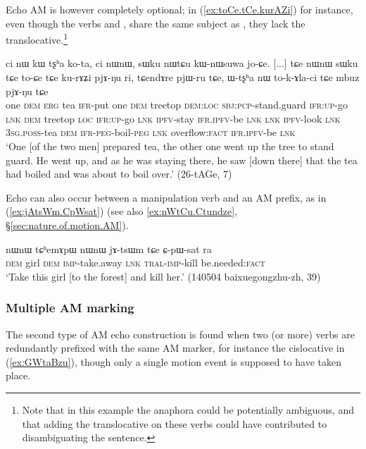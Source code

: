 Echo AM is however completely optional; in (\ref{ex:toCe.tCe.kurAZi}) for instance, even though the verbs  and , share the same subject as , they lack the translocative.\footnote{Note that in this example the anaphora could be potentially ambiguous, and that adding the translocative on these verbs could have contributed to disambiguating the sentence. }

\begin{exe}
\ex \label{ex:toCe.tCe.kurAZi}
\gll ci nɯ kɯ tʂʰa ko-ta, ci nɯnɯ, sɯku nɯtɕu kɯ-nɯsuwa jo-ɕe. [...] tɕe nɯnɯ sɯku tɕe to-ɕe tɕe ku-rɤʑi pjɤ-ŋu ri,
tɕendɤre pjɯ-ru tɕe, ɯ-tʂʰa nɯ to-k-ɤla-ci tɕe mbuz pjɤ-ŋu tɕe  \\
one \textsc{dem} \textsc{erg} tea \textsc{ifr}-put one \textsc{dem} treetop \textsc{dem}:\textsc{loc} \textsc{sbj}:\textsc{pcp}-stand.guard \textsc{ifr}:\textsc{up}-go { } \textsc{lnk} \textsc{dem} treetop \textsc{loc} \textsc{ifr}:\textsc{up}-go \textsc{lnk} \textsc{ipfv}-stay \textsc{ifr}.\textsc{ipfv}-be \textsc{lnk} \textsc{lnk} \textsc{ipfv}-look \textsc{lnk} \textsc{3sg}.\textsc{poss}-tea \textsc{dem} \textsc{ifr}-\textsc{peg}-boil-\textsc{peg} \textsc{lnk} overflow:\textsc{fact} \textsc{ifr}.\textsc{ipfv}-be \textsc{lnk} \\
\glt `One [of the two men] prepared tea, the other one went up the tree to stand guard. He went up, and as he was staying there, he saw [down there] that the tea had boiled and was about to boil over.' (26-tAGe, 7)
\end{exe}

Echo can also occur between a manipulation verb and an AM prefix, as in (\ref{ex:jAtsWm.CpWsat}) (see also  \ref{ex:nWtCu.Ctundze},  §\ref{sec:nature.of.motion.AM}).

\begin{exe}
	\ex \label{ex:jAtsWm.CpWsat}
	\gll nɯnɯ tɕʰemɤpɯ nɯnɯ jɤ-tsɯm tɕe ɕ-pɯ-sat ra \\
	\textsc{dem} girl \textsc{dem} \textsc{imp}-take.away \textsc{lnk} \textsc{tral}-\textsc{imp}-kill be.needed:\textsc{fact} \\
	\glt `Take this girl [to the forest] and kill her.' (140504 baixuegongzhu-zh, 39)
\end{exe}


\subsubsection{Multiple AM marking} \label{sec:echo.multiple.AM}
The second type of AM echo construction is found when two (or more) verbs are redundantly prefixed with the same AM marker, for instance the cislocative  in (\ref{ex:GWtaBzu}), though only a single motion event is supposed to have taken place.

